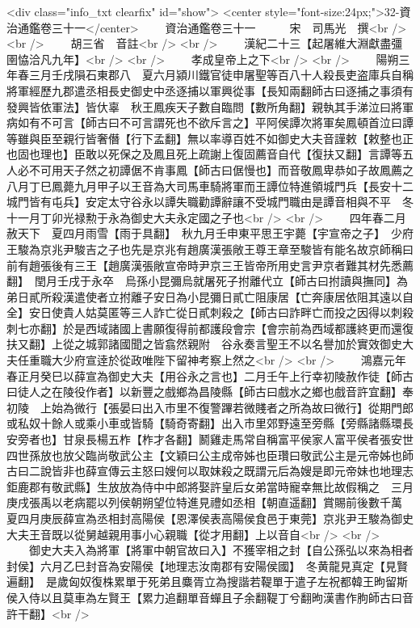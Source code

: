 <div class="info_txt clearfix" id="show">
<center style="font-size:24px;">32-資治通鑑卷三十一</center>
  　　資治通鑑卷三十一　　　宋　司馬光　撰<br />
<br />
　　胡三省　音註<br />
<br />
　　漢紀二十三【起屠維大淵獻盡彊圉恊洽凡九年】<br />
<br />
　　孝成皇帝上之下<br />
<br />
　　陽朔三年春三月壬戌隕石東郡八　夏六月潁川鐵官徒申屠聖等百八十人殺長吏盗庫兵自稱將軍經歷九郡遣丞相長史御史中丞逐捕以軍興從事【長知兩翻師古曰逐捕之事須有發興皆依軍法】皆㐲辜　秋王鳳疾天子數自臨問【數所角翻】親執其手涕泣曰將軍病如有不可言【師古曰不可言謂死也不欲斥言之】平阿侯譚次將軍矣鳳頓首泣曰譚等雖與臣至親行皆奢僭【行下孟翻】無以率導百姓不如御史大夫音謹敕【敕整也正也固也理也】臣敢以死保之及鳳且死上疏謝上復固薦音自代【復扶又翻】言譚等五人必不可用天子然之初譚倨不肯事鳳【師古曰倨慢也】而音敬鳳卑恭如子故鳳薦之八月丁巳鳳薨九月甲子以王音為大司馬車騎將軍而王譚位特進領城門兵【長安十二城門皆有屯兵】安定太守谷永以譚失職勸譚辭讓不受城門職由是譚音相與不平　冬十一月丁卯光禄勲于永為御史大夫永定國之子也<br />
<br />
　　四年春二月赦天下　夏四月雨雪【雨于具翻】　秋九月壬申東平思王宇薨【宇宣帝之子】　少府王駿為京兆尹駿吉之子也先是京兆有趙廣漢張敞王尊王章至駿皆有能名故京師稱曰前有趙張後有三王【趙廣漢張敞宣帝時尹京三王皆帝所用史言尹京者難其材先悉薦翻】　閏月壬戌于永卒　烏孫小昆彌烏就屠死子拊離代立【師古曰拊讀與撫同】為弟日貳所殺漢遣使者立拊離子安日為小昆彌日貳亡阻康居【亡奔康居依阻其遠以自全】安日使貴人姑莫匿等三人詐亡從日貳刺殺之【師古曰詐畔亡而投之因得以刺殺刺七亦翻】於是西域諸國上書願復得前都護段會宗【會宗前為西域都護終更而還復扶又翻】上從之城郭諸國聞之皆翕然親附　谷永奏言聖王不以名譽加於實效御史大夫任重職大少府宣逹於從政唯陛下留神考察上然之<br />
<br />
　　鴻嘉元年春正月癸巳以薛宣為御史大夫【用谷永之言也】二月壬午上行幸初陵赦作徒【師古曰徒人之在陵役作者】以新豐之戲鄉為昌陵縣【師古曰戲水之鄉也戲音許宜翻】奉初陵　上始為微行【張晏曰出入市里不復警蹕若微賤者之所為故曰微行】從期門郎或私奴十餘人或乘小車或皆騎【騎奇寄翻】出入市里郊野遠至旁縣【旁縣諸縣環長安旁者也】甘泉長楊五柞【柞才各翻】鬭雞走馬常自稱富平侯家人富平侯者張安世四世孫放也放父臨尚敬武公主【文穎曰公主成帝姊也臣瓚曰敬武公主是元帝姊也師古曰二說皆非也薛宣傳云主怒曰嫂何以取妺殺之既謂元后為嫂是即元帝妹也地理志鉅鹿郡有敬武縣】生放放為侍中中郎將娶許皇后女弟當時寵幸無比故假稱之　三月庚戌張禹以老病罷以列侯朝朔望位特進見禮如丞相【朝直遥翻】賞賜前後數千萬　夏四月庚辰薛宣為丞相封高陽侯【恩澤侯表高陽侯食邑于東莞】京兆尹王駿為御史大夫王音既以從舅越親用事小心親職【從才用翻】上以音自<br />
<br />
　　御史大夫入為將軍【將軍中朝官故曰入】不獲宰相之封【自公孫弘以來為相者封侯】六月乙巳封音為安陽侯【地理志汝南郡有安陽侯國】　冬黄龍見真定【見賢遍翻】　是歲匈奴復株累單于死弟且麋胥立為搜諧若鞮單于遣子左祝都韓王昫留斯侯入侍以且莫車為左賢王【累力追翻單音蟬且子余翻鞮丁兮翻昫漢書作胊師古曰音許干翻】<br />
